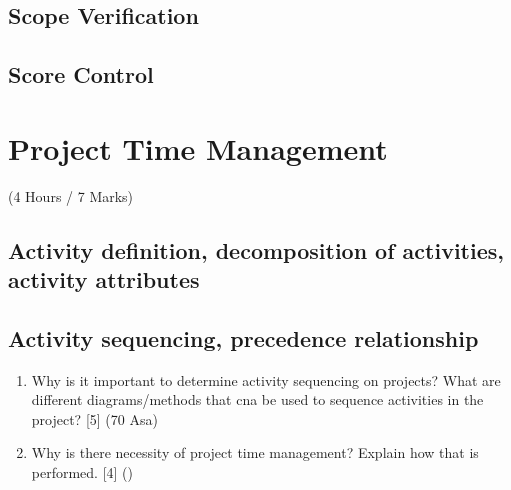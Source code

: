 \documentclass[12pt]{article}
\begin{document}
  \subsection{Scope Verification}
  \subsection{Score Control}

\pagebreak

\section{Project Time Management}
  \begin{center}(4 Hours / 7 Marks)\end{center}

  \subsection{Activity definition, decomposition of activities, activity attributes}
  \subsection{Activity sequencing, precedence relationship}
    \begin{enumerate}
      \item Why is it important to determine activity sequencing on projects? What are different diagrams/methods that cna be used to sequence activities in the project? \hfill [5] (70 Asa)

      \item Why is there necessity of project time management? Explain how that is performed. \hfill [4] ()
    \end{enumerate}
\end{document}
